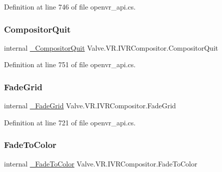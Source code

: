 Definition at line 746 of file openvr\+\_\+api.\+cs.

\mbox{\label{struct_valve_1_1_v_r_1_1_i_v_r_compositor_a3fa5673221b03129290c0fd5dd9401ed}} 
\subsubsection{\texorpdfstring{CompositorQuit}{CompositorQuit}}
{\footnotesize\ttfamily internal \mbox{\hyperlink{struct_valve_1_1_v_r_1_1_i_v_r_compositor_a06ecd250e5b6b1b461d10582eb94e16c}{\+\_\+\+Compositor\+Quit}} Valve.\+V\+R.\+I\+V\+R\+Compositor.\+Compositor\+Quit}



Definition at line 751 of file openvr\+\_\+api.\+cs.

\mbox{\label{struct_valve_1_1_v_r_1_1_i_v_r_compositor_a8db3c38a395e7352920379547c8071a0}} 
\subsubsection{\texorpdfstring{FadeGrid}{FadeGrid}}
{\footnotesize\ttfamily internal \mbox{\hyperlink{struct_valve_1_1_v_r_1_1_i_v_r_compositor_a24abe64d80aceed84bdeabb788a8b683}{\+\_\+\+Fade\+Grid}} Valve.\+V\+R.\+I\+V\+R\+Compositor.\+Fade\+Grid}



Definition at line 721 of file openvr\+\_\+api.\+cs.

\mbox{\label{struct_valve_1_1_v_r_1_1_i_v_r_compositor_a09cc2ac11d93021e5f9e6530fab0757b}} 
\subsubsection{\texorpdfstring{FadeToColor}{FadeToColor}}
{\footnotesize\ttfamily internal \mbox{\hyperlink{struct_valve_1_1_v_r_1_1_i_v_r_compositor_ab967ee4e10a9344a4790c20786ed21c6}{\+\_\+\+Fade\+To\+Color}} Valve.\+V\+R.\+I\+V\+R\+Compositor.\+Fade\+To\+Color}



